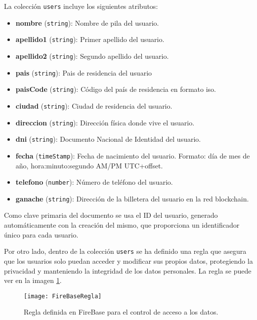 La colección \texttt{users} incluye los siguientes atributos:
\begin{itemize}
 	\item \textbf{nombre} (\texttt{string}): Nombre de pila del usuario.
    \item \textbf{apellido1} (\texttt{string}): Primer apellido del
     usuario.
    \item \textbf{apellido2} (\texttt{string}): Segundo apellido del
     usuario.
    \item \textbf{pais} (\texttt{string}): Pais de residencia del usuario
    \item \textbf{paisCode} (\texttt{string}): Código del país de
     residencia en formato iso.
    \item \textbf{ciudad} (\texttt{string}): Ciudad de residencia del
     usuario.
    \item \textbf{direccion} (\texttt{string}): Dirección física donde vive
     el usuario.
    \item \textbf{dni} (\texttt{string}): Documento Nacional de Identidad
     del usuario.
    \item \textbf{fecha} (\texttt{timeStamp}): Fecha de nacimiento del
     usuario. Formato: día de mes de año, hora:minuto:segundo AM/PM
     UTC+offset.
    \item \textbf{telefono} (\texttt{number}): Número de teléfono del
     usuario.
    \item \textbf{ganache} (\texttt{string}): Dirección de la billetera del
     usuario en la red blockchain.


\end{itemize}

Como clave primaria del documento se usa el ID del usuario, generado automáticamente con la creación del mismo, que proporciona un identificador único para cada usuario.

Por otro lado, dentro de la colección \texttt{users} se ha definido una regla que asegura que los usuarios solo puedan acceder y modificar sus propios datos, protegiendo la privacidad y manteniendo la integridad de los datos personales. La regla se puede ver en la imagen \ref{img:FireBaseRegla}.

\begin{figure}[h]
	\label{img:FireBaseRegla}
	\centering
	\texttt{[image: FireBaseRegla]}
	\caption[Regla Firebase]{Regla definida en FireBase para el control de acceso a los datos.}
\end{figure}


